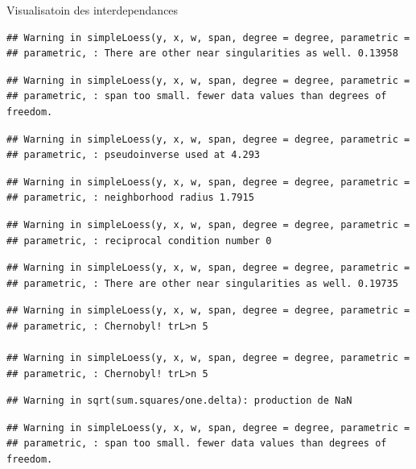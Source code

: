 \documentclass[11pt,ignorenonframetext,]{beamer}
\begin{document}
\begin{frame}[fragile]{Visualisatoin des interdependances}
\begin{verbatim}
## Warning in simpleLoess(y, x, w, span, degree = degree, parametric =
## parametric, : There are other near singularities as well. 0.13958
\end{verbatim}

\begin{verbatim}
## Warning in simpleLoess(y, x, w, span, degree = degree, parametric =
## parametric, : span too small. fewer data values than degrees of freedom.
\end{verbatim}

\begin{verbatim}
## Warning in simpleLoess(y, x, w, span, degree = degree, parametric =
## parametric, : pseudoinverse used at 4.293
\end{verbatim}

\begin{verbatim}
## Warning in simpleLoess(y, x, w, span, degree = degree, parametric =
## parametric, : neighborhood radius 1.7915
\end{verbatim}

\begin{verbatim}
## Warning in simpleLoess(y, x, w, span, degree = degree, parametric =
## parametric, : reciprocal condition number 0
\end{verbatim}

\begin{verbatim}
## Warning in simpleLoess(y, x, w, span, degree = degree, parametric =
## parametric, : There are other near singularities as well. 0.19735
\end{verbatim}

\begin{verbatim}
## Warning in simpleLoess(y, x, w, span, degree = degree, parametric =
## parametric, : Chernobyl! trL>n 5

## Warning in simpleLoess(y, x, w, span, degree = degree, parametric =
## parametric, : Chernobyl! trL>n 5
\end{verbatim}

\begin{verbatim}
## Warning in sqrt(sum.squares/one.delta): production de NaN
\end{verbatim}

\begin{verbatim}
## Warning in simpleLoess(y, x, w, span, degree = degree, parametric =
## parametric, : span too small. fewer data values than degrees of freedom.
\end{verbatim}


\end{frame}
\end{document}
